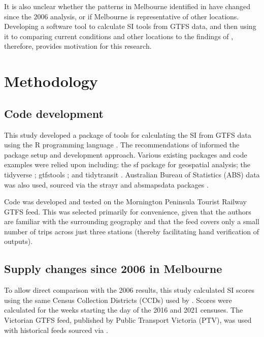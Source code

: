 \documentclass[preprint, 3p,
authoryear]{elsarticle} %
\begin{document}
It is also unclear whether the patterns in Melbourne identified in
\citet{currie2010identifying} have changed since the 2006 analysis, or
if Melbourne is representative of other locations. Developing a software
tool to calculate SI tools from GTFS data, and then using it to
comparing current conditions and other locations to the findings of
\citet{currie2010identifying}, therefore, provides motivation for this
research.

\section{Methodology}\label{methodology}

\subsection{Code development}\label{code-development}

This study developed a package of tools for calculating the SI from GTFS
data using the R programming language \citep{R-base}. The
recommendations of \citet{wickham2023r} informed the package setup and
development approach. Various existing packages and code examples were
relied upon including: the sf package \citep{R-sf} for geospatial
analysis; the tidyverse \citep{tidyverse2019}; gtfstools
\citep{R-gtfstools}; and tidytransit \citep{R-tidytransit}. Australian
Bureau of Statistics (ABS) data was also used, sourced via the strayr
and absmapsdata packages \citep{r-strayr}.

Code was developed and tested on the Mornington Peninsula Tourist
Railway GTFS feed. This was selected primarily for convenience, given
that the authors are familiar with the surrounding geography and that
the feed covers only a small number of trips across just three stations
(thereby facilitating hand verification of outputs).

\subsection{Supply changes since 2006 in
Melbourne}\label{supply-changes-since-2006-in-melbourne}

To allow direct comparison with the 2006 results, this study calculated
SI scores using the same Census Collection Districts (CCDs) used by
\citet{currie2010identifying}. Scores were calculated for the weeks
starting the day of the 2016 and 2021 censuses. The Victorian GTFS feed,
published by Public Transport Victoria (PTV), was used with historical
feeds sourced via \citet{transitfeeds_victoria:2023aa}.
\end{document}
